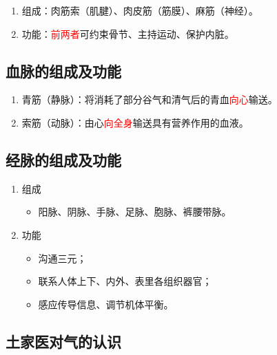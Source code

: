 \documentclass[cn,blue,12pt,normal,founder]{elegantnote}
\newcommand{\redt}[1]{\textcolor{red}{{}#1}}      %
\begin{document}
\begin{enumerate}
  \item 组成：肉筋索（肌腱）、肉皮筋（筋膜）、麻筋（神经）。
  \item 功能：\redt{前两者}可约束骨节、主持运动、保护内脏。
\end{enumerate}

\subsection{血脉的组成及功能}

\begin{enumerate}
  \item 青筋（静脉）：将消耗了部分谷气和清气后的青血\redt{向心}输送。
  \item 索筋（动脉）：由心\redt{向全身}输送具有营养作用的血液。
\end{enumerate}

\subsection{经脉的组成及功能}

\begin{enumerate}
  \item 组成
  \begin{itemize}
    \item 阳脉、阴脉、手脉、足脉、胞脉、裤腰带脉。
  \end{itemize}
  \item 功能
  \begin{itemize}
    \item 沟通三元；
    \item 联系人体上下、内外、表里各组织器官；
    \item 感应传导信息、调节机体平衡。
  \end{itemize}
\end{enumerate}

\subsection{土家医对气的认识}
\end{document}
